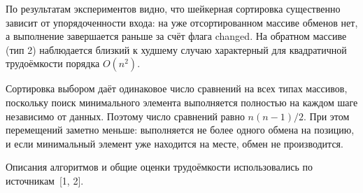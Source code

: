 \documentclass[a4paper,12pt]{article}
\newcommand{\code}[1]{{\ttfamily #1}}
\begin{document}
\begin{table}[H]
\centering
\small
\renewcommand{\arraystretch}{1.15}
\setlength{\tabcolsep}{6pt}
\caption{Таблица 2: Результаты работы Selection Sort}
\end{table}

По результатам экспериментов видно, что шейкерная сортировка существенно зависит от упорядоченности входа: на уже отсортированном массиве обменов нет, а выполнение завершается раньше за счёт флага \code{changed}. На обратном массиве (тип 2) наблюдается близкий к худшему случаю характерный для квадратичной трудоёмкости порядка $O(n^2)$.

Сортировка выбором даёт одинаковое число сравнений на всех типах массивов, поскольку поиск минимального элемента выполняется полностью на каждом шаге независимо от данных. Поэтому число сравнений равно $n(n-1)/2$. При этом перемещений заметно меньше: выполняется не более одного обмена на позицию, и если минимальный элемент уже находится на месте, обмен не производится.

Описания алгоритмов и общие оценки трудоёмкости использовались по источникам~[1, 2].

\end{document}
